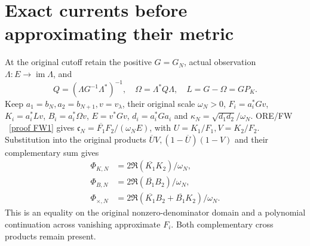 \documentclass[11pt]{article}
\begin{document}
\section{Exact currents before approximating their metric}
At the original cutoff retain the positive $G=G_N$, actual observation
$\Lambda:E\to\operatorname{im}\Lambda$, and
\[
 Q=(\Lambda G^{-1}\Lambda^*)^{-1},\quad
 \Omega=\Lambda^*Q\Lambda,\quad L=G-\Omega=GP_K.\tag{HG6}
\]
Keep $a_1=b_N,a_2=b_{N+1},v=v_\lambda$, their original scale
$\omega_N>0$, $F_i=a_i^*Gv$, $K_i=a_i^*Lv$,
$B_i=a_i^*\Omega v$, $E=v^*Gv$, $d_i=a_i^*Ga_i$ and
$\kappa_N=\sqrt{d_1d_2}/\omega_N$.
ORE/FW \cite{FW}%
~\href{https://github.com/KokunoYumeto/zeta-function-research-reader/blob/5992ad50c0f2a06921f1fcaded7b4e38097c0739/workbenches/splitzero-tandem/continuations/20260920-original-kernel-mixed-determinants/providers/FULL_WINDOW_SOURCE_PRODUCTS.tex\#L28}{[proof FW1]}%
{} gives
$\mathfrak c_N=\overline{F_1}F_2/(\omega_NE)$, with
$U=K_1/F_1,V=K_2/F_2$. Substitution into the original products
$\overline UV,(1-\overline U)(1-V)$ and their complementary sum gives
\[
 \begin{aligned}
 \Phi_{K,N}&=2\Re(\overline{K_1}K_2)/\omega_N,\\
 \Phi_{B,N}&=2\Re(\overline{B_1}B_2)/\omega_N,\\
 \Phi_{\times,N}&=2\Re(\overline{K_1}B_2+\overline{B_1}K_2)/\omega_N.
 \end{aligned}\tag{HG7}
\]
This is an equality on the original nonzero-denominator domain and
a polynomial continuation across vanishing approximate $F_i$.
Both complementary cross products remain present.
\end{document}
